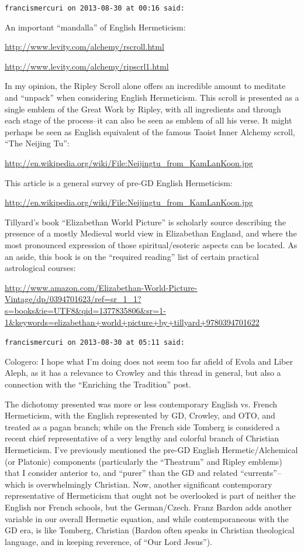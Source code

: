 \begin{footnotesize}
\begin{sffamily}
\hfill

\texttt{francismercuri on 2013-08-30 at 00:16 said:}

An important ``mandalla'' of English Hermeticism:

\url{http://www.levity.com/alchemy/rscroll.html}

\url{http://www.levity.com/alchemy/ripscrl1.html}


In my opinion, the Ripley Scroll alone offers an incredible amount to meditate and ``unpack'' when considering English Hermeticism. This scroll is presented as a single emblem of the Great Work by Ripley, with all ingredients and through each stage of the process--it can also be seen as emblem of all his verse. It might perhaps be seen as English equivalent of the famous Taoist Inner Alchemy scroll, ``The Neijing Tu'':

\url{http://en.wikipedia.org/wiki/File:Neijingtu\_from\_KamLanKoon.jpg}


This article is a general survey of pre-GD English Hermeticism:

\url{http://en.wikipedia.org/wiki/File:Neijingtu\_from\_KamLanKoon.jpg}

Tillyard's book ``Elizabethan World Picture'' is scholarly source describing the presence of a mostly Medieval world view in Elizabethan England, and where the most pronounced expression of those spiritual/esoteric aspects can be located. As an aside, this book is on the ``required reading'' list of certain practical astrological courses:

\url{http://www.amazon.com/Elizabethan-World-Picture-Vintage/dp/0394701623/ref=sr\_1\_1?s=books\&ie=UTF8\&qid=1377835806\&sr=1-1\&keywords=elizabethan+world+picture+by+tillyard+9780394701622}

\hfill

\texttt{francismercuri on 2013-08-30 at 05:11 said:}

Cologero: I hope what I'm doing does not seem too far afield of Evola and Liber Aleph, as it has a relevance to Crowley and this thread in general, but also a connection with the ``Enriching the Tradition'' post.

The dichotomy presented was more or less contemporary English vs. French Hermeticism, with the English represented by GD, Crowley, and OTO, and treated as a pagan branch; while on the French side Tomberg is considered a recent chief representative of a very lengthy and colorful branch of Christian Hermeticism. I've previously mentioned the pre-GD English Hermetic/Alchemical (or Platonic) components (particularly the ``Theatrum'' and Ripley emblems) that I consider anterior to, and ``purer'' than the GD and related ``currents''--which is overwhelmingly Christian. Now, another significant contemporary representative of Hermeticism that ought not be overlooked is part of neither the English nor French schools, but the German/Czech. Franz Bardon adds another variable in our overall Hermetic equation, and while contemporaneous with the GD era, is like Tomberg, Christian (Bardon often speaks in Christian theological language, and in keeping reverence, of ``Our Lord Jesus'').


\end{sffamily}
\end{footnotesize}
